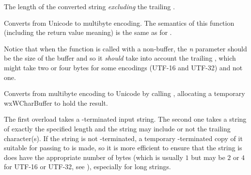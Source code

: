 



The length of the converted string \emph{excluding} the trailing \NUL.


\label{wxmbconvwc2mb}



Converts from Unicode to multibyte encoding. The semantics of this function
(including the return value meaning) is the same as for 
.

Notice that when the function is called with a non-\NULL buffer, the 
{\it n} parameter should be the size of the buffer and so it \emph{should} take
into account the trailing \NUL, which might take two or four bytes for some
encodings (UTF-16 and UTF-32) and not one.


\label{wxmbconvcmb2wc}



Converts from multibyte encoding to Unicode by calling 
, allocating a temporary wxWCharBuffer to hold
the result.

The first overload takes a \NUL-terminated input string. The second one takes a
string of exactly the specified length and the string may include or not the
trailing \NUL character(s). If the string is not \NUL-terminated, a temporary 
\NUL-terminated copy of it suitable for passing to  
is made, so it is more efficient to ensure that the string is does have the
appropriate number of \NUL bytes (which is usually $1$ but may be $2$ or $4$
for UTF-16 or UTF-32, see ),
especially for long strings.

